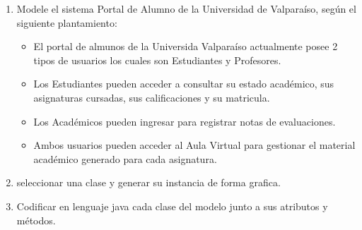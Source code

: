 \documentclass{exam}
\begin{document}
\begin{questions}

  \begin{enumerate}
		\item Modele el sistema Portal de Alumno de la Universidad de Valpara\'iso, seg\'un el siguiente plantamiento:
    \begin{itemize}
      \item El portal de almunos de la Universida Valpara\'iso actualmente posee 2 tipos de usuarios los cuales son Estudiantes y Profesores.
      \item Los Estudiantes pueden acceder a consultar su estado acad\'emico, sus asignaturas cursadas, sus calificaciones y su matricula.
      \item Los Acad\'emicos pueden ingresar para registrar notas de evaluaciones.
      \item Ambos usuarios pueden acceder al Aula Virtual para gestionar el material acad\'emico  generado para cada asignatura.
    \end{itemize}
    \item seleccionar una clase y generar su instancia de forma grafica.
    \item Codificar en lenguaje java cada clase del modelo junto a sus atributos y m\'etodos.
    \end{enumerate}
\end{questions}
\end{document}
